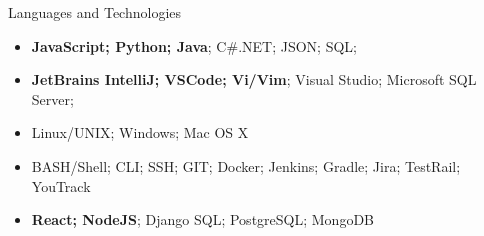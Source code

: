 \documentclass[]{mcdowellcv}
\begin{document}
	\begin{cvsection}{Languages and Technologies}
		\begin{cvsubsection}{}{}{}	
			\begin{itemize}
				\item \textbf{JavaScript; Python; Java}; C\#.NET; JSON; SQL; 
				\item \textbf{JetBrains IntelliJ; VSCode; Vi/Vim}; Visual Studio; Microsoft SQL Server;
				\item Linux/UNIX; Windows; Mac OS X
				\item BASH/Shell; CLI; SSH; GIT; Docker; Jenkins; Gradle; Jira; TestRail; YouTrack
				\item \textbf{React; NodeJS}; Django SQL; PostgreSQL; MongoDB
			\end{itemize}
		\end{cvsubsection}
	\end{cvsection}
	
\end{document}
